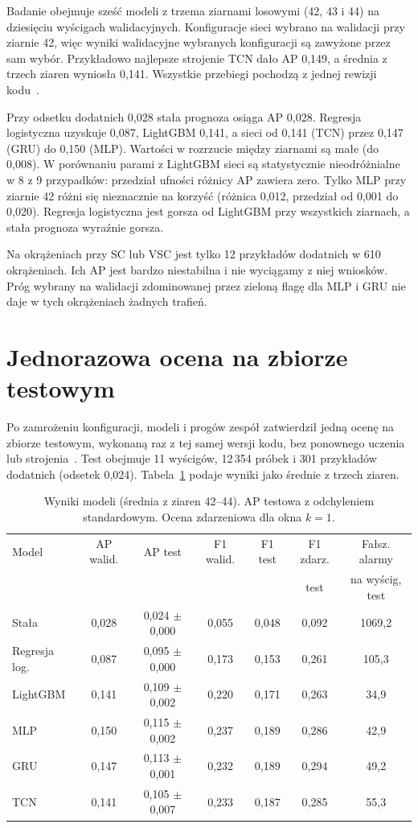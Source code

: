 Badanie obejmuje sześć modeli z trzema ziarnami losowymi (42, 43 i 44)
na dziesięciu wyścigach walidacyjnych. Konfiguracje sieci wybrano na
walidacji przy ziarnie 42, więc wyniki walidacyjne wybranych konfiguracji
są zawyżone przez sam wybór. Przykładowo najlepsze strojenie TCN dało AP
0,149, a średnia z trzech ziaren wyniosła 0,141. Wszystkie przebiegi pochodzą
z jednej rewizji kodu~\cite{validation}.

Przy odsetku dodatnich 0,028 stała prognoza osiąga AP 0,028. Regresja
logistyczna uzyskuje 0,087, LightGBM 0,141, a sieci od 0,141 (TCN)
przez 0,147 (GRU) do 0,150 (MLP). Wartości w rozrzucie między ziarnami
są małe (do 0,008). W porównaniu parami z LightGBM sieci są statystycznie
nieodróżnialne w 8 z 9 przypadków: przedział ufności różnicy AP zawiera
zero. Tylko MLP przy ziarnie 42 różni się nieznacznie na korzyść
(różnica 0,012, przedział od 0,001 do 0,020). Regresja logistyczna jest
gorsza od LightGBM przy wszystkich ziarnach, a stała prognoza
wyraźnie gorsza.

Na okrążeniach przy SC lub VSC jest tylko 12 przykładów dodatnich
w 610 okrążeniach. Ich AP jest bardzo niestabilna i nie wyciągamy z niej
wniosków. Próg wybrany na walidacji zdominowanej przez zieloną flagę
dla MLP i GRU nie daje w tych okrążeniach żadnych trafień.

\section{Jednorazowa ocena na zbiorze testowym}

Po zamrożeniu konfiguracji, modeli i progów zespół zatwierdził jedną ocenę
na zbiorze testowym, wykonaną raz z tej samej wersji kodu, bez ponownego
uczenia lub strojenia~\cite{test}. Test obejmuje 11 wyścigów, 12\,354 próbek
i 301 przykładów dodatnich (odsetek 0,024).
Tabela~\ref{tab:results} podaje wyniki jako średnie z trzech ziaren.

\begin{table}[htbp]
\centering\small
\caption{Wyniki modeli (średnia z ziaren 42--44). AP testowa z odchyleniem
standardowym. Ocena zdarzeniowa dla okna $k=1$.}
\label{tab:results}
\setlength{\tabcolsep}{4pt}
\begin{tabular}{lcccccc}
\toprule
Model & AP walid. & AP test & F1 walid. & F1 test & F1 zdarz. & Fałsz. alarmy \\
 & & & & & test & na wyścig, test \\
\midrule
Stała & 0,028 & 0,024 $\pm$ 0,000 & 0,055 & 0,048 & 0,092 & 1069,2 \\
Regresja log. & 0,087 & 0,095 $\pm$ 0,000 & 0,173 & 0,153 & 0,261 & 105,3 \\
LightGBM & 0,141 & 0,109 $\pm$ 0,002 & 0,220 & 0,171 & 0,263 & 34,9 \\
MLP & 0,150 & 0,115 $\pm$ 0,002 & 0,237 & 0,189 & 0,286 & 42,9 \\
GRU & 0,147 & 0,113 $\pm$ 0,001 & 0,232 & 0,189 & 0,294 & 49,2 \\
TCN & 0,141 & 0,105 $\pm$ 0,007 & 0,233 & 0,187 & 0,285 & 55,3 \\
\bottomrule
\end{tabular}
\end{table}

